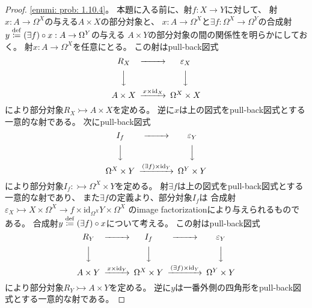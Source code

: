 \documentclass[uplatex]{jsarticle}
\theoremstyle{definition}
\def\ep{\varepsilon}
\def\id{\mathrm{id}}
\newcommand{\rtot}{\rightarrowtail}
\newcommand{\dfn}{\overset{\mathrm{\tiny def}}{\coloneqq}}
\begin{document}
\begin{proof}
  \ref{enumi: prob: 1.10.4}。
  本題に入る前に、射\(f:X\to Y\)に対して、
  射\(x:A\to \Omega^X\)の与える\(A\times X\)の部分対象と、
  \(x:A\to \Omega^X\)と\(\exists f:\Omega^X\to \Omega^Y\)の合成射
  \(y\dfn (\exists f) \circ x: A\to \Omega^Y\)の与える
  \(A\times Y\)の部分対象の間の関係性を明らかにしておく。
  射\(x:A\to \Omega^X\)を任意にとる。
  この射はpull-back図式
  \[
  \begin{CD}
    R_X @>>> \ep_X \\
    @VVV @VVV \\
    A\times X @> x \times \id_X >> \Omega^X\times X
  \end{CD}
  \]
  により部分対象\(R_X \rtot A\times X\)を定める。
  逆に\(x\)は上の図式をpull-back図式とする一意的な射である。
  次にpull-back図式
  \[
  \begin{CD}
    I_f @>>> \ep_Y \\
    @VVV @VVV \\
    \Omega^X \times Y @> (\exists f) \times \id_Y >> \Omega^Y \times Y
  \end{CD}
  \]
  により部分対象\(I_f :\rtot \Omega^X\times Y\)を定める。
  射\(\exists f\)は上の図式をpull-back図式とする一意的な射であり、
  また\(\exists f\)の定義より、部分対象\(I_f\)は
  合成射\(\ep_X \rtot X\times \Omega^X \rightarrow{f\times \id_{\Omega^X}} Y\times \Omega^X\)
  のimage factorizationにより与えられるものである。
  合成射\(y \dfn (\exists f) \circ x\)について考える。
  この射はpull-back図式
  \[
  \begin{CD}
    R_Y @>>> I_f @>>> \ep_Y \\
    @VVV @VVV @VVV \\
    A\times Y @> x\times \id_Y >> \Omega^X \times Y
    @> (\exists f) \times \id_Y >> \Omega^Y\times Y
  \end{CD}
  \]
  により部分対象\(R_Y \rtot A\times Y\)を定める。
  逆に\(y\)は一番外側の四角形をpull-back図式とする一意的な射である。


\end{proof}
\end{document}
